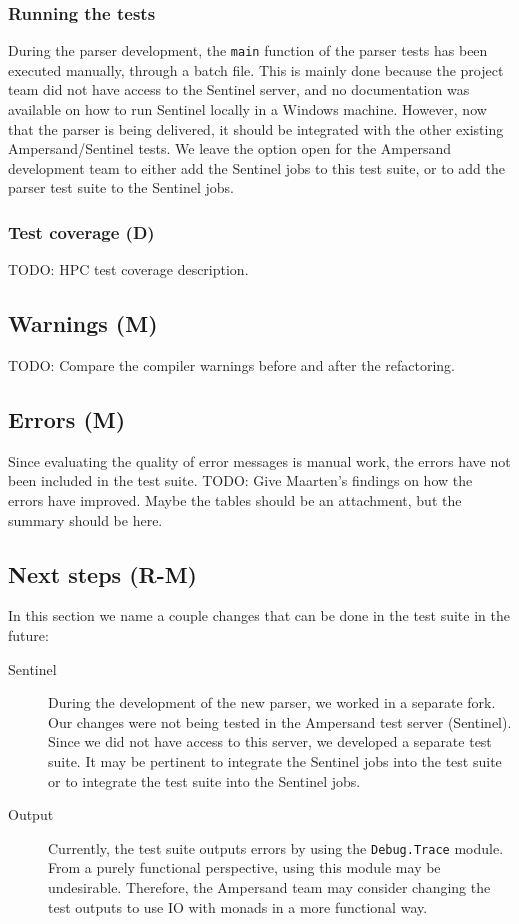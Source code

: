   \subsubsection{Running the tests}
  During the parser development, the \texttt{main} function of the parser tests has been executed manually, through a batch file.
  This is mainly done because the project team did not have access to the Sentinel server, and no documentation was available on how to run Sentinel locally in a Windows machine.
  However, now that the parser is being delivered, it should be integrated with the other existing Ampersand/Sentinel tests.
  We leave the option open for the Ampersand development team to either add the Sentinel jobs to this test suite, or to add the parser test suite to the Sentinel jobs.
  
  \subsubsection{Test coverage (D)}
  TODO: HPC test coverage description.
  
\subsection{Warnings (M)}
TODO: Compare the compiler warnings before and after the refactoring.

\subsection{Errors (M)}
  Since evaluating the quality of error messages is manual work, the errors have not been included in the test suite.
  TODO: Give Maarten's findings on how the errors have improved. Maybe the tables should be an attachment, but the summary should be here.

\subsection{Next steps (R-M)}
\label{subsec:test-next-steps}
  In this section we name a couple changes that can be done in the test suite in the future:
  \begin{description}
    \item[Sentinel] During the development of the new parser, we worked in a separate fork.
      Our changes were not being tested in the Ampersand test server (Sentinel).
      Since we did not have access to this server, we developed a separate test suite.
      It may be pertinent to integrate the Sentinel jobs into the test suite or to integrate the test suite into the Sentinel jobs.
    
    \item[Output] Currently, the test suite outputs errors by using the \texttt{Debug.Trace} module.
      From a purely functional perspective, using this module may be undesirable.
      Therefore, the Ampersand team may consider changing the test outputs to use IO with monads in a more functional way.
  \end{description}
